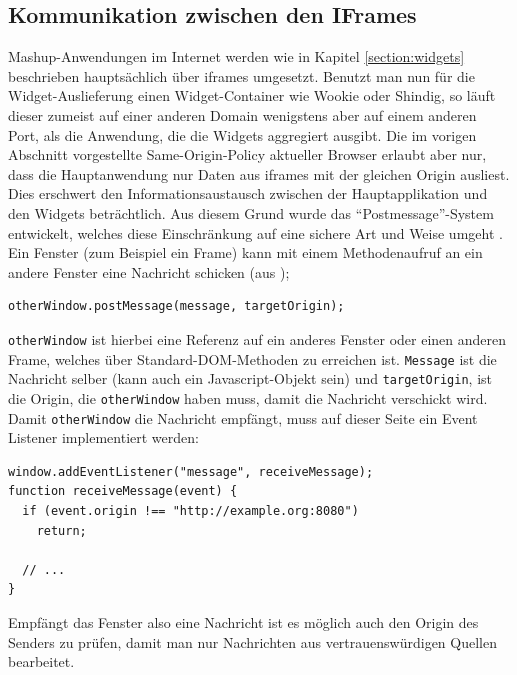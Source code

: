 \subsection{Kommunikation zwischen den IFrames}\label{section:kommunikation_zwischen_iframes}
Mashup-Anwendungen im Internet werden wie in Kapitel \ref{section:widgets} beschrieben hauptsächlich über iframes umgesetzt. Benutzt man nun für die Widget-Auslieferung einen Widget-Container wie Wookie oder Shindig, so läuft dieser zumeist auf einer anderen Domain wenigstens aber auf einem anderen Port, als die Anwendung, die die Widgets aggregiert ausgibt. Die im vorigen Abschnitt vorgestellte Same-Origin-Policy aktueller Browser erlaubt aber nur, dass die Hauptanwendung nur Daten aus iframes mit der gleichen Origin ausliest. Dies erschwert den Informationsaustausch zwischen der Hauptapplikation und den Widgets beträchtlich. Aus diesem Grund wurde das "`Postmessage"'-System entwickelt, welches diese Einschränkung auf eine sichere Art und Weise umgeht \cite{MDN2012}. Ein Fenster (zum Beispiel ein Frame) kann mit einem Methodenaufruf an ein andere Fenster eine Nachricht schicken (aus \cite{MDN2012});
\begin{lstlisting}
otherWindow.postMessage(message, targetOrigin);
\end{lstlisting}
\texttt{otherWindow} ist hierbei eine Referenz auf ein anderes Fenster oder einen anderen Frame, welches über Standard-DOM-Methoden zu erreichen ist. \texttt{Message} ist die Nachricht selber (kann auch ein Javascript-Objekt sein) und \texttt{targetOrigin}, ist die Origin, die \texttt{otherWindow} haben muss, damit die Nachricht verschickt wird. Damit \texttt{otherWindow} die Nachricht empfängt, muss auf dieser Seite ein Event Listener implementiert werden:
\begin{lstlisting}
window.addEventListener("message", receiveMessage);
function receiveMessage(event) {
  if (event.origin !== "http://example.org:8080")
    return;
 
  // ...
}
\end{lstlisting}
Empfängt das Fenster also eine Nachricht ist es möglich auch den Origin des Senders zu prüfen, damit man nur Nachrichten aus vertrauenswürdigen Quellen bearbeitet.

